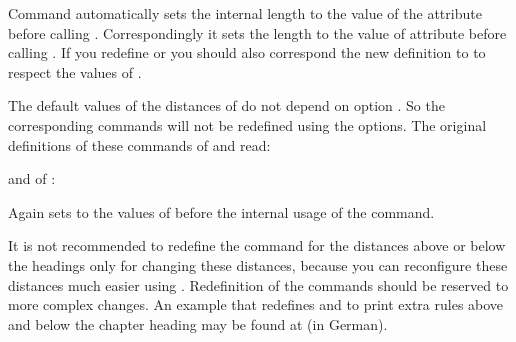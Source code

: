 Command  automatically sets the internal length
 to the value of the
 attribute
 before calling
. Correspondingly it sets the length to the value
of attribute  before calling . If
you redefine  or  you
should also correspond the new definition to  to respect
the values of .

The default values of the distances of  do not depend on option
. So the corresponding commands will not be redefined using
the options. The original definitions of these commands of  and
 read:
\begin{lstcode}
  \newcommand*{\partheadstartvskip}{%
    \null\vskip-\baselineskip\vskip\@tempskipa
  }
  \newcommand*{\partheadmidvskip}{%
    \par\nobreak
    \vskip 20pt
  }
  \newcommand*{\partheadendvskip}{%
    \vskip\@tempskipa\newpage
  }
\end{lstcode}
and of :
\begin{lstcode}
  \newcommand*{\partheadstartvskip}{%
    \addvspace{\@tempskipa}%
  }
  \newcommand*{\partheadmidvskip}{%
    \par\nobreak
  }
  \newcommand*{\partheadendvskip}{%
    \vskip\@tempskipa
  }
\end{lstcode}
Again  sets  to the values of
 before the
internal usage of the command.

It is not recommended to redefine the command for the distances above or below
the headings only for changing these distances, because you can reconfigure
these distances much easier using
. Redefinition of the commands should be
reserved to more complex changes. An  example that
redefines  and  to
print extra rules above and below the chapter heading may be found at
\cite{homepage} (in German).%
%
%
%
%
%
%
%
%



